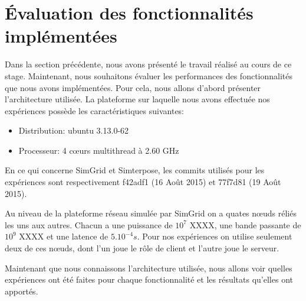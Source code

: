 \section{Évaluation des fonctionnalités implémentées}
\label{section:evaluation}

Dans la section précédente, nous avons présenté le travail réalisé au cours de ce stage. Maintenant, nous souhaitons évaluer les performances des fonctionnalités que nous avons implémentées. Pour cela, nous allons d'abord présenter l'architecture utilisée. La plateforme sur laquelle nous avons effectuée nos expériences possède les caractéristiques suivantes:
\begin{itemize}
\item Distribution: ubuntu 3.13.0-62
\item Processeur: 4 c\oe urs multithread à 2.60 GHz
\end{itemize}
En ce qui concerne SimGrid et Simterpose, les commits utilisés pour les expériences sont respectivement f42adf1 (16 Août 2015) et 77f7d81 (19 Août 2015). 

Au niveau de la plateforme réseau simulée par SimGrid on a quates n\oe uds réliés les uns aux autres. Chacun a une puissance de $10^7$ {\color{red} XXXX}, une bande passante de $10^9$ {\color{red} XXXX} et une latence de $5.10^{-4}s$. Pour nos expériences on utilise seulement deux de ces n\oe uds, dont l'un joue le rôle de client et l'autre joue le serveur. 

Maintenant que nous connaissons l'architecture utilisée, nous allons voir quelles expériences ont été faites pour chaque fonctionnalité et les résultats qu'elles ont apportés.
